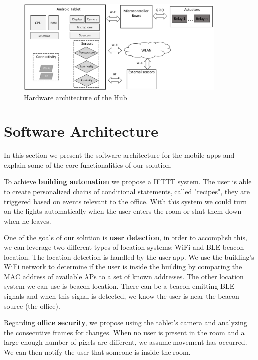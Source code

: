\begin{figure}[h]
\centering
\includegraphics[width=0.9\textwidth]{Figures/arch_hardware}
\caption{Hardware architecture of the Hub}
\label{hard_architecture_system}
\end{figure}


\section{Software Architecture}\label{architecture4} 

In this section we present the software architecture for the mobile apps and explain some of the core functionalities of our solution.

To achieve \textbf{building automation} we propose a \ac{IFTTT} system. The user is able to create personalized chains of conditional statements, called "recipes", they are triggered based on events relevant to the office. With this system we could turn on the lights automatically when the user enters the room or shut them down when he leaves.

One of the goals of our solution is \textbf{user detection}, in order to accomplish this, we can leverage two different types of location systems: \ac{WiFi} and \ac{BLE} beacon location. The location detection is handled by the user app. We use the building's \ac{WiFi} network to determine if the user is inside the building by comparing the \ac{MAC} address of available \ac{AP}s to a set of known addresses. The other location system we can use is beacon location. There can be a beacon emitting \ac{BLE} signals and when this signal is detected, we know the user is near the beacon source (the office).

Regarding \textbf{office security}, we propose using the tablet's camera and analyzing the consecutive frames for changes. When no user is present in the room and a large enough number of pixels are different, we assume movement has occurred. We can then notify the user that someone is inside the room.


